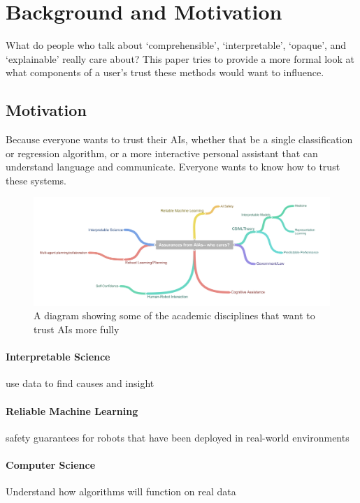 \section{Background and Motivation} \label{sec:background}

What do people who talk about `comprehensible', `interpretable', `opaque', and `explainable' really care about? This paper tries to provide a more formal look at what components of a user's trust these methods would want to influence.

\subsection{Motivation}
    Because everyone wants to trust their AIs, whether that be a single classification or regression algorithm, or a more interactive personal assistant that can understand language and communicate. Everyone wants to know how to trust these systems.  

	\begin{figure}
        \includegraphics[width=7.5in]{Figures/WhoCares_cleaned}%
    	\caption{A diagram showing some of the academic disciplines that want to trust AIs more fully}
        \label{fig:WhoCares}
    \end{figure}

    \paragraph{Interpretable Science} use data to find causes and insight
    \paragraph{Reliable Machine Learning} safety guarantees for robots that have been deployed in real-world environments
    \paragraph{Computer Science} Understand how algorithms will function on real data
